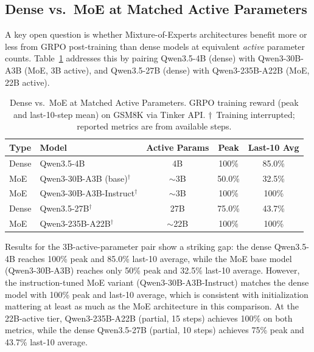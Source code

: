 \documentclass{article}
\begin{document}
\subsection{Dense vs.~MoE at Matched Active Parameters}
\label{sec:dense_moe}

A key open question is whether Mixture-of-Experts architectures benefit
more or less from GRPO post-training than dense models at equivalent
\emph{active} parameter counts. Table~\ref{tab:dense_moe} addresses this
by pairing Qwen3.5-4B (dense) with Qwen3-30B-A3B (MoE, 3B active),
and Qwen3.5-27B (dense) with Qwen3-235B-A22B (MoE, 22B active).

\begin{table}[htbp]
\centering
\caption{Dense vs.~MoE at Matched Active Parameters. GRPO training reward (peak and
last-10-step mean) on GSM8K via Tinker API.
$\dagger$~Training interrupted; reported metrics are from available steps.}
\label{tab:dense_moe}
\begin{tabular}{llccc}
\toprule
\textbf{Type} & \textbf{Model} & \textbf{Active Params} & \textbf{Peak} & \textbf{Last-10 Avg} \\
\midrule
Dense & Qwen3.5-4B & 4B & 100\% & 85.0\% \\
MoE & Qwen3-30B-A3B (base)$^\dagger$ & $\sim$3B & 50.0\% & 32.5\% \\
MoE & Qwen3-30B-A3B-Instruct$^\dagger$ & $\sim$3B & 100\% & 100\% \\
\midrule
Dense & Qwen3.5-27B$^\dagger$ & 27B & 75.0\% & 43.7\% \\
MoE & Qwen3-235B-A22B$^\dagger$ & $\sim$22B & 100\% & 100\% \\
\bottomrule
\end{tabular}
\end{table}

Results for the 3B-active-parameter pair show a striking gap: the dense
Qwen3.5-4B reaches 100\% peak and 85.0\% last-10 average, while the
MoE base model (Qwen3-30B-A3B) reaches only 50\% peak and 32.5\% last-10
average. However, the instruction-tuned MoE variant (Qwen3-30B-A3B-Instruct)
matches the dense model with 100\% peak and last-10 average, which is
consistent with initialization mattering at least as much as the MoE
architecture in this comparison. At the 22B-active tier, Qwen3-235B-A22B
(partial, 15 steps) achieves 100\% on both metrics, while the dense
Qwen3.5-27B (partial, 10 steps) achieves 75\% peak and 43.7\% last-10 average.
\end{document}
